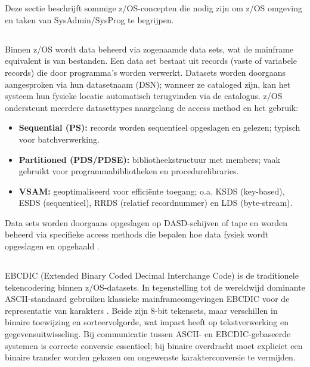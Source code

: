 \section{}
\label{sec:kenmerken-van-zos-architectuur}
Deze sectie beschrijft sommige z/OS-concepten die nodig zijn om z/OS omgeving en taken van SysAdmin/SysProg te begrijpen.
\subsection{}
\label{sec:datasets-op-zos}
Binnen z/OS wordt data beheerd via zogenaamde data sets, wat de mainframe equivalent is van bestanden. Een data set bestaat uit records (vaste of variabele records) die door programma’s worden verwerkt. Datasets worden doorgaans aangesproken via hun datasetnaam (DSN); wanneer ze cataloged zijn, kan het systeem hun fysieke locatie automatisch terugvinden via de catalogus.
z/OS ondersteunt meerdere datasettypes naargelang de access method en het gebruik:
\begin{itemize}
	\item \textbf{Sequential (PS):} records worden sequentieel opgeslagen en gelezen; typisch voor batchverwerking.
	\item \textbf{Partitioned (PDS/PDSE):} bibliotheekstructuur met members; vaak gebruikt voor programmabibliotheken en procedurelibraries.
	\item \textbf{VSAM:} geoptimaliseerd voor efficiënte toegang; o.a. KSDS (key-based), ESDS (sequentieel), RRDS (relatief recordnummer) en LDS (byte-stream).
\end{itemize}

Data sets worden doorgaans opgeslagen op DASD-schijven of tape en worden beheerd via specifieke access methods die bepalen hoe data fysiek wordt opgeslagen en opgehaald \autocite{IBM_zOS_Concepts}.

\subsection{}
\label{sec:ebcdic-op-zos}

EBCDIC (Extended Binary Coded Decimal Interchange Code) is de traditionele tekencodering binnen z/OS-datasets. In tegenstelling tot de wereldwijd dominante ASCII-standaard gebruiken klassieke mainframeomgevingen EBCDIC voor de representatie van karakters \autocite{IBM_zOS_Concepts}. Beide zijn 8-bit tekensets, maar verschillen in binaire toewijzing en sorteervolgorde, wat impact heeft op tekstverwerking en gegevensuitwisseling. Bij communicatie tussen ASCII- en EBCDIC-gebaseerde systemen is correcte conversie essentieel; bij binaire overdracht moet expliciet een binaire transfer worden gekozen om ongewenste karakterconversie te vermijden.

